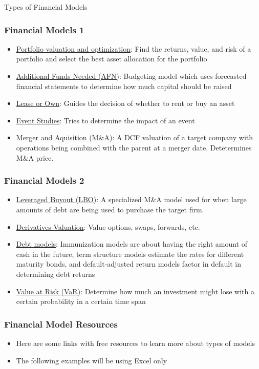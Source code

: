 \documentclass[handout, 11pt]{beamer}
\begin{document}
\begin{section}{Types of Financial Models}
\begin{frame}
\frametitle{Financial Models 1}
\begin{itemize}
\item \underline{Portfolio valuation and optimization}: Find the returns, value, and risk of a portfolio and select the best asset allocation for the portfolio
\vfill
\item \underline{Additional Funds Needed (AFN)}: Budgeting model which uses forecasted financial statements to determine how much capital should be raised
\vfill
\item \underline{Lease or Own}: Guides the decision of whether to rent or buy an asset
\vfill
\item \underline{Event Studies}: Tries to determine the impact of an event
\vfill
\item \underline{Merger and Aquisition (M\&A)}: A DCF valuation of a target company with operations being combined with the parent at a merger date. Detetermines M\&A price.
\end{itemize}
\end{frame}
\begin{frame}
\frametitle{Financial Models 2}
\begin{itemize}
\item \underline{Leveraged Buyout (LBO)}: A specialized M\&A model used for when large amounts of debt are being used to purchase the target firm.
\vfill
\item \underline{Derivatives Valuation}: Value options, swaps, forwards, etc.
\vfill
\item \underline{Debt models}: Immunization models are about having the right amount of cash in the future, term structure models estimate the rates for different maturity bonds, and default-adjusted return models factor in default in determining debt returns
\vfill
\item \underline{Value at Risk (VaR)}: Determine how much an investment might lose with a certain probability in a certain time span
\end{itemize}
\end{frame}
\begin{frame}
\frametitle{Financial Model Resources}
\begin{itemize}
\item Here are some links with free resources to learn more about types of models
\vfill
\item The following examples will be using Excel only

\end{itemize}
\end{frame}
\end{section}
\end{document}

